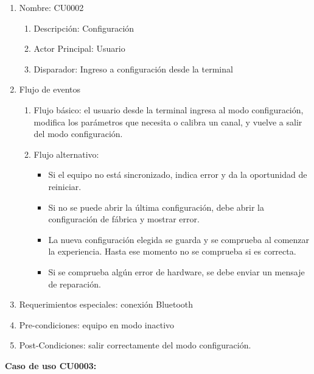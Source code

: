 	\begin{enumerate} 
		\item Nombre: CU0002
		\begin{enumerate} [label*=\arabic*.]
			\item Descripción: Configuración
			\item Actor Principal: Usuario
			\item Disparador: Ingreso a configuración desde la terminal
		\end{enumerate}
		\item Flujo de eventos
		\begin{enumerate} [label*=\arabic*.]
			\item Flujo básico: el usuario desde la terminal ingresa al modo configuración, modifica los parámetros que necesita o calibra un canal, y vuelve a salir del modo configuración.
			\item Flujo alternativo:
			\begin{itemize}
				\item Si el equipo no está sincronizado, indica error y da la oportunidad de reiniciar. 
				\item Si no se puede abrir la última configuración, debe abrir la configuración de fábrica y mostrar error.
				\item La nueva configuración elegida se guarda y se comprueba al comenzar la experiencia. Hasta ese momento no se comprueba si es correcta.
				\item Si se comprueba algún error de hardware, se debe enviar un mensaje de reparación.						
			\end{itemize}				
		\end{enumerate}

		\item Requerimientos especiales: conexión Bluetooth
		\item Pre-condiciones: equipo en modo inactivo
		\item Post-Condiciones: salir correctamente del modo configuración.
	\end{enumerate}



	\textbf{Caso de uso CU0003:}

